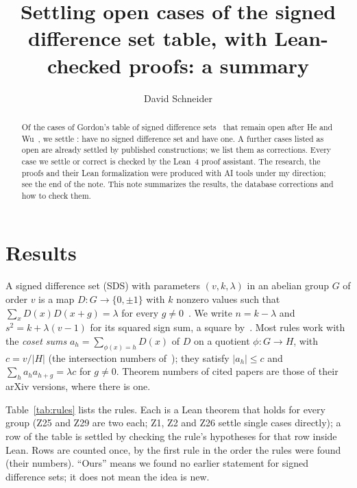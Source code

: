 \documentclass[11pt]{amsart}
\title[Open cases of the SDS table]{Settling open cases of the signed difference set table,
with Lean-checked proofs: a summary}
\author{David Schneider}
\date{\todo{date}}
\begin{document}
\begin{abstract}
Of the \openAfterHeWu{} cases of Gordon's table of signed difference sets~\cite{gordon-db} that
remain open after He and Wu~\cite{he-wu}, we settle \ourRows: \ourNone{} have no signed difference set and \ourExists{} have
one. A further \corrections{} cases listed as open are already settled by published
constructions; we list them as corrections.
Every case we settle or correct is checked by the Lean~4 proof assistant. The research, the proofs and
their Lean formalization were produced with AI tools under my direction; see the end of the
note. This note summarizes the results, the database corrections and
how to check them.
\end{abstract}

\maketitle

\section{Results}

A signed difference set (SDS) with parameters $(v,k,\lambda)$ in an abelian group $G$ of
order $v$ is a map $D \colon G \to \{0, \pm 1\}$ with $k$ nonzero values such that
$\sum_x D(x) D(x+g) = \lambda$ for every $g \neq 0$~\cite{gordon}. We write $n = k - \lambda$
and $s^2 = k + \lambda(v-1)$ for its squared sign sum, a square by~\cite[Lemma~1.1]{gordon}.
Most rules work with the \emph{coset sums} $a_h = \sum_{\phi(x) = h} D(x)$ of $D$ on a
quotient $\phi \colon G \to H$, with $c = v/|H|$ (the intersection numbers
of~\cite[Lemma~5.2]{gordon}); they satisfy $|a_h| \le c$ and $\sum_h a_h a_{h+g} = \lambda c$
for $g \neq 0$. Theorem numbers of cited papers are those of their arXiv versions, where there is one.

Table~\ref{tab:rules} lists the rules. Each is a Lean theorem that holds for every group (Z25
and Z29 are two each; Z1, Z2 and Z26 settle single cases directly); a row of the table is
settled by checking the rule's hypotheses for that row inside Lean. Rows are counted once, by
the first rule in the order the rules were found (their numbers). ``Ours'' means we found no
earlier statement for signed difference sets; it does not mean the idea is new.
\end{document}
